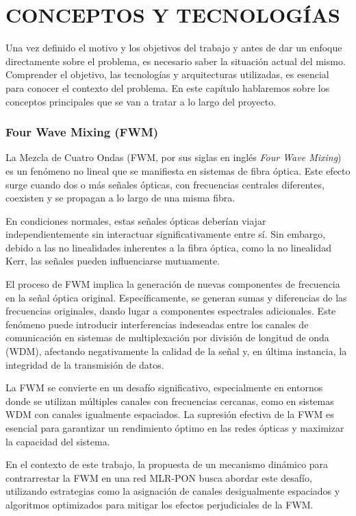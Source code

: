 \chapter{CONCEPTOS Y TECNOLOGÍAS}
\label{chap2:conceptos}

Una vez definido el motivo y los objetivos del trabajo y antes de dar un enfoque
directamente sobre el problema, es necesario saber la situación actual del mismo.
Comprender el objetivo, las tecnologías y arquitecturas utilizadas, es esencial para conocer el contexto del problema. En este capítulo hablaremos sobre los conceptos principales que se van a tratar a lo largo del proyecto.



\subsection{Four Wave Mixing (FWM)}
La Mezcla de Cuatro Ondas (FWM, por sus siglas en inglés \textit{Four Wave Mixing}) es un fenómeno no lineal que se manifiesta en sistemas de fibra óptica. Este efecto surge cuando dos o más señales ópticas, con frecuencias centrales diferentes, coexisten y se propagan a lo largo de una misma fibra.

En condiciones normales, estas señales ópticas deberían viajar independientemente sin interactuar significativamente entre sí. Sin embargo, debido a las no linealidades inherentes a la fibra óptica, como la no linealidad Kerr, las señales pueden influenciarse mutuamente.

El proceso de FWM implica la generación de nuevas componentes de frecuencia en la señal óptica original. Específicamente, se generan sumas y diferencias de las frecuencias originales, dando lugar a componentes espectrales adicionales. Este fenómeno puede introducir interferencias indeseadas entre los canales de comunicación en sistemas de multiplexación por división de longitud de onda (WDM), afectando negativamente la calidad de la señal y, en última instancia, la integridad de la transmisión de datos.

La FWM se convierte en un desafío significativo, especialmente en entornos donde se utilizan múltiples canales con frecuencias cercanas, como en sistemas WDM con canales igualmente espaciados. La supresión efectiva de la FWM es esencial para garantizar un rendimiento óptimo en las redes ópticas y maximizar la capacidad del sistema.

En el contexto de este trabajo, la propuesta de un mecanismo dinámico para contrarrestar la FWM en una red MLR-PON busca abordar este desafío, utilizando estrategias como la asignación de canales desigualmente espaciados y algoritmos optimizados para mitigar los efectos perjudiciales de la FWM.


